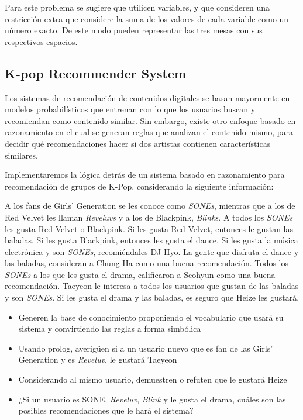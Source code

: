 \documentclass[]{book}
\theoremstyle{definition}
\begin{document}
Para este problema se sugiere que utilicen variables, y que consideren una restricción extra que considere la suma de los valores de cada variable como un número exacto. De este modo pueden representar las tres mesas con sus respectivos espacios.

\pagebreak

\subsection*{K-pop Recommender System}

Los sistemas de recomendación de contenidos digitales se basan mayormente en modelos probabilísticos que entrenan con lo que los usuarios buscan y recomiendan como contenido similar.
Sin embargo, existe otro enfoque basado en razonamiento en el cual se generan reglas que analizan el contenido mismo, para decidir qué recomendaciones hacer si dos artistas contienen características similares.

Implementaremos la lógica detrás de un sistema basado en razonamiento para recomendación de grupos de K-Pop, considerando la siguiente información:

\vspace{2ex}

A los fans de Girls' Generation se les conoce como \textit{SONEs}, mientras que a los de Red Velvet les llaman \textit{Reveluvs} y a los de Blackpink, \textit{Blinks}.
A todos los \textit{SONEs} les gusta Red Velvet o Blackpink.
Si les gusta Red Velvet, entonces le gustan las baladas.
Si les gusta Blackpink, entonces les gusta el dance.
Si les gusta la música electrónica y son \textit{SONEs}, recomiéndales DJ Hyo.
La gente que disfruta el dance y las baladas, consideran a Chung Ha como una buena recomendación.
Todos los \textit{SONEs} a los que les gusta el drama, calificaron a Seohyun como una buena recomendación.
Taeyeon le interesa a todos los usuarios que gustan de las baladas y son \textit{SONEs}.
Si les gusta el drama y las baladas, es seguro que Heize les gustará.

\bigskip

\begin{itemize}
    \item Generen la base de conocimiento proponiendo el vocabulario que usará su sistema y convirtiendo las reglas a forma simbólica
    \item Usando prolog, averigüen si a un usuario nuevo que es fan de las Girls' Generation y es \textit{Reveluv}, le gustará Taeyeon
    \item Considerando al mismo usuario, demuestren o refuten que le gustará Heize
    \item ¿Si un usuario es SONE, \textit{Reveluv}, \textit{Blink} y le gusta el drama, cuáles son las posibles recomendaciones que le hará el sistema?
\end{itemize}
\end{document}
